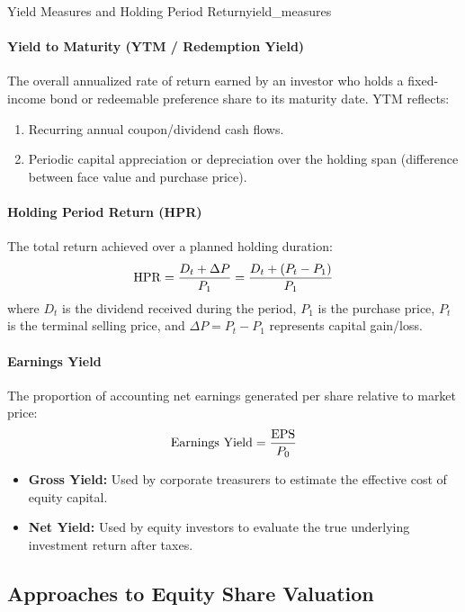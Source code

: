 \begin{definition}{Yield Measures and Holding Period Return}{yield_measures}
\paragraph{Yield to Maturity (YTM / Redemption Yield)}
The overall annualized rate of return earned by an investor who holds a fixed-income bond or redeemable preference share to its maturity date. YTM reflects:
\begin{enumerate}[noitemsep, leftmargin=*]
    \item Recurring annual coupon/dividend cash flows.
    \item Periodic capital appreciation or depreciation over the holding span (difference between face value and purchase price).
\end{enumerate}

\paragraph{Holding Period Return (HPR)}
The total return achieved over a planned holding duration:
\begin{equation}
    \operatorname{HPR} = \frac{D_t + \Delta P}{P_1} = \frac{D_t + (P_t - P_1)}{P_1}
\end{equation}
where $D_t$ is the dividend received during the period, $P_1$ is the purchase price, $P_t$ is the terminal selling price, and $\Delta P = P_t - P_1$ represents capital gain/loss.

\paragraph{Earnings Yield}
The proportion of accounting net earnings generated per share relative to market price:
\begin{equation}
    \text{Earnings Yield} = \frac{\operatorname{EPS}}{P_0}
\end{equation}
\begin{itemize}[noitemsep]
    \item \textbf{Gross Yield:} Used by corporate treasurers to estimate the effective cost of equity capital.
    \item \textbf{Net Yield:} Used by equity investors to evaluate the true underlying investment return after taxes.
\end{itemize}
\end{definition}

\subsection{Approaches to Equity Share Valuation}

